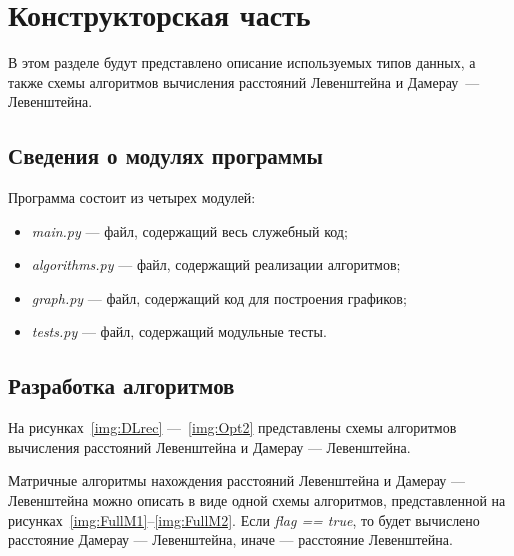 \chapter{Конструкторская часть}

В этом разделе будут представлено описание используемых типов данных,
а также схемы алгоритмов вычисления расстояний Левенштейна и Дамерау~--- Левенштейна.

\section{Сведения о модулях программы}

Программа состоит из четырех модулей:
\begin{itemize}[label={---}]
	\item \textit{main.py} --- файл, содержащий весь служебный код;
	\item \textit{algorithms.py} --- файл, содержащий реализации алгоритмов;
	\item \textit{graph.py} --- файл, содержащий код для построения графиков; 
	\item \textit{tests.py} --- файл, содержащий модульные тесты.
\end{itemize}

\section{Разработка алгоритмов}

На рисунках~\ref{img:DLrec} ---~\ref{img:Opt2} представлены схемы алгоритмов вычисления расстояний Левенштейна и Дамерау --- Левенштейна.




Матричные алгоритмы нахождения расстояний Левенштейна и Дамерау --- Левенштейна можно описать в виде одной схемы алгоритмов, представленной на рисунках~\ref{img:FullM1}--\ref{img:FullM2}. Если \textit{flag == true}, то будет вычислено расстояние Дамерау --- Левенштейна, иначе --- расстояние Левенштейна.


